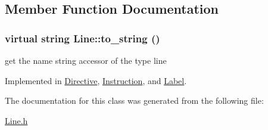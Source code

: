 \subsection{Member Function Documentation}
\hypertarget{classLine_a477523118f17d72f58f2912b391afc73}{
\subsubsection[{to\_\-string}]{\setlength{\rightskip}{0pt plus 5cm}virtual string Line::to\_\-string ()}}
\label{classLine_a477523118f17d72f58f2912b391afc73}


get the name string accessor of the type line 

Implemented in \hyperlink{classDirective_a2fd56d5580ad7a993782649d7867732f}{Directive}, \hyperlink{classInstruction_aed87de5e9259f4f15dc885425528f1fe}{Instruction}, and \hyperlink{classLabel_a6df2e96366cc459a6a8fa9642a6e69b6}{Label}.

The documentation for this class was generated from the following file:\begin{DoxyCompactItemize}
\item 
\hyperlink{Line_8h}{Line.h}\end{DoxyCompactItemize}
